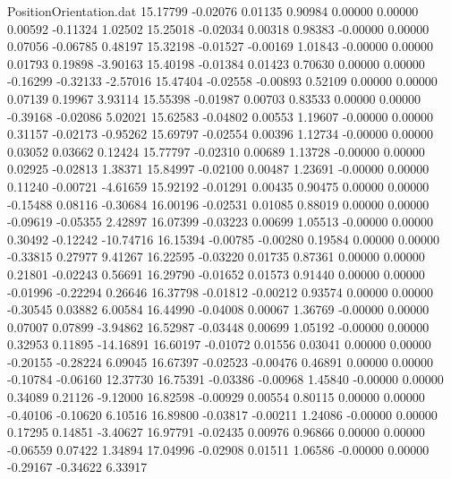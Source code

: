 \begin{filecontents}{PositionOrientation.dat}
  15.17799   -0.02076    0.01135     0.90984    0.00000    0.00000    0.00592   -0.11324    1.02502
  15.25018   -0.02034    0.00318     0.98383   -0.00000    0.00000    0.07056   -0.06785    0.48197
  15.32198   -0.01527   -0.00169     1.01843   -0.00000    0.00000    0.01793    0.19898   -3.90163
  15.40198   -0.01384    0.01423     0.70630    0.00000    0.00000   -0.16299   -0.32133   -2.57016
  15.47404   -0.02558   -0.00893     0.52109    0.00000    0.00000    0.07139    0.19967    3.93114
  15.55398   -0.01987    0.00703     0.83533    0.00000    0.00000   -0.39168   -0.02086    5.02021
  15.62583   -0.04802    0.00553     1.19607   -0.00000    0.00000    0.31157   -0.02173   -0.95262
  15.69797   -0.02554    0.00396     1.12734   -0.00000    0.00000    0.03052    0.03662    0.12424
  15.77797   -0.02310    0.00689     1.13728   -0.00000    0.00000    0.02925   -0.02813    1.38371
  15.84997   -0.02100    0.00487     1.23691   -0.00000    0.00000    0.11240   -0.00721   -4.61659
  15.92192   -0.01291    0.00435     0.90475    0.00000    0.00000   -0.15488    0.08116   -0.30684
  16.00196   -0.02531    0.01085     0.88019    0.00000    0.00000   -0.09619   -0.05355    2.42897
  16.07399   -0.03223    0.00699     1.05513   -0.00000    0.00000    0.30492   -0.12242  -10.74716
  16.15394   -0.00785   -0.00280     0.19584    0.00000    0.00000   -0.33815    0.27977    9.41267
  16.22595   -0.03220    0.01735     0.87361    0.00000    0.00000    0.21801   -0.02243    0.56691
  16.29790   -0.01652    0.01573     0.91440    0.00000    0.00000   -0.01996   -0.22294    0.26646
  16.37798   -0.01812   -0.00212     0.93574    0.00000    0.00000   -0.30545    0.03882    6.00584
  16.44990   -0.04008    0.00067     1.36769   -0.00000    0.00000    0.07007    0.07899   -3.94862
  16.52987   -0.03448    0.00699     1.05192   -0.00000    0.00000    0.32953    0.11895  -14.16891
  16.60197   -0.01072    0.01556     0.03041    0.00000    0.00000   -0.20155   -0.28224    6.09045
  16.67397   -0.02523   -0.00476     0.46891    0.00000    0.00000   -0.10784   -0.06160   12.37730
  16.75391   -0.03386   -0.00968     1.45840   -0.00000    0.00000    0.34089    0.21126   -9.12000
  16.82598   -0.00929    0.00554     0.80115    0.00000    0.00000   -0.40106   -0.10620    6.10516
  16.89800   -0.03817   -0.00211     1.24086   -0.00000    0.00000    0.17295    0.14851   -3.40627
  16.97791   -0.02435    0.00976     0.96866    0.00000    0.00000   -0.06559    0.07422    1.34894
  17.04996   -0.02908    0.01511     1.06586   -0.00000    0.00000   -0.29167   -0.34622    6.33917

\end{filecontents}
